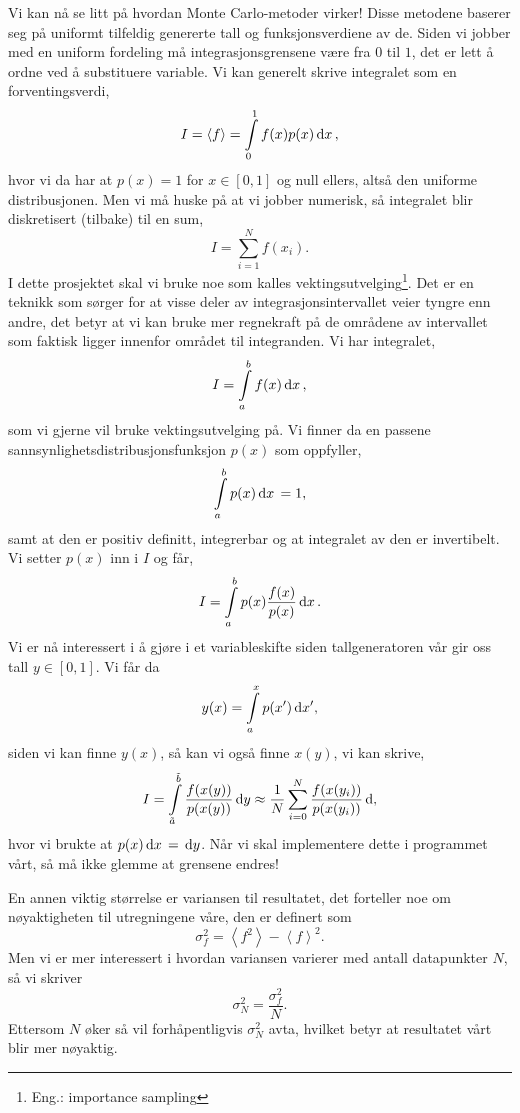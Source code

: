 \documentclass[norsk, 10pt,twocolumn]{article}
\newcommand{\dx}{\, {\rm d}x\, }
\newcommand{\dd}{\, {\text d} }
\def\mean#1{\left\langle #1 \right\rangle}
\begin{document}
Vi kan nå se litt på hvordan Monte Carlo-metoder virker! Disse metodene baserer seg på uniformt tilfeldig genererte tall og funksjonsverdiene av de. Siden vi jobber med en uniform fordeling må integrasjonsgrensene være fra $0$ til $1$, det er lett å ordne ved å substituere variable. Vi kan generelt skrive integralet som en forventingsverdi,
\begin{equation}
	I = \mean{f} = \int\limits_0^1 f(x) p(x) \dx,
\end{equation}
hvor vi da har at $p(x) = 1$ for $x\in[0,1]$ og null ellers, altså den uniforme distribusjonen. Men vi må huske på at vi jobber numerisk, så integralet blir diskretisert (tilbake) til en sum,
$$ I = \sum\limits_{i=1}^N f(x_i). $$
I dette prosjektet skal vi bruke noe som kalles vektingsutvelging\footnote{Eng.: importance sampling}. Det er en teknikk som sørger for at visse deler av integrasjonsintervallet veier tyngre enn andre, det betyr at vi kan bruke mer regnekraft på de områdene av intervallet som faktisk ligger innenfor området til integranden. Vi har integralet,
$$ I = \int\limits_a^b f(x)\dx, $$
som vi gjerne vil bruke vektingsutvelging på. Vi finner da en passene sannsynlighetsdistribusjonsfunksjon $p(x)$ som oppfyller,
$$ \int\limits_a^b p(x)\dx = 1,$$
samt at den er positiv definitt, integrerbar og at integralet av den er invertibelt. Vi setter $p(x)$ inn i $I$ og får,
$$ I = \int\limits_a^b p(x) \frac{f(x)}{p(x)}\dx. $$
Vi er nå interessert i å gjøre i et variableskifte siden tallgeneratoren vår gir oss tall $y\in[0,1]$. Vi får da
$$ y(x) = \int\limits_a^x p(x')\dd x', $$
siden vi kan finne $y(x)$, så kan vi også finne $x(y)$, vi kan skrive,
\begin{equation} I = \int\limits_{\tilde a}^{\tilde b} \frac{f(x(y))}{p(x(y))}\dd y \approx \frac{1}{N}\sum\limits_{i=0}^N \frac{f(x(y_i))}{p(x(y_i))}\dd, \label{varskift}\end{equation}
hvor vi brukte at $p(x) \dx = \dd y$. Når vi skal implementere dette i programmet vårt, så må ikke glemme at grensene endres!


En annen viktig størrelse er variansen til resultatet, det forteller noe om nøyaktigheten til utregningene våre, den er definert som
$$ \sigma_f^2 = \mean{f^2} - \mean{f}^2.$$
Men vi er mer interessert i hvordan variansen varierer med antall datapunkter $N$, så vi skriver
$$ \sigma_N^2 = \frac{\sigma_f^2}{N}. $$
Ettersom $N$ øker så vil forhåpentligvis $\sigma_N^2$ avta, hvilket betyr at resultatet vårt blir mer nøyaktig.
\end{document}
